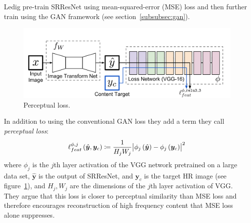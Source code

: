 Ledig \etal pre-train SRResNet using mean-squared-error (MSE) loss and then further train using the GAN framework (see section~\ref{subsubsec:gan}).
%
\begin{figure}
    \centering
    \begin{adjustbox}{width=\linewidth}
        \centering
        \includegraphics[]{figures/neural_networks/perceptual_loss.png}
    \end{adjustbox}
    \caption{Perceptual loss\cite{johnson2016perceptual}.}\label{fig:perceptualloss}
\end{figure}
In addition to using the conventional GAN loss they add a term they call \textit{perceptual loss}:
\begin{equation}
    \ell_{feat}^{\phi, j} \left( \hat{\bm{y}}, \bm{y}_c\right) \coloneqq \frac{1}{H_j W_j} \abs{\phi_j\left({\hat{\bm{y}}}\right) - \phi_j \left(\bm{y}_c\right)}^2
\end{equation}
where \(\phi_j\) is the \(j\)th layer activation of the VGG network\cite{simonyan2014very} pretrained on a large data set, \(\hat{\bm{y}}\) is the output of SRResNet, and \(\bm{y}_c\) is the target HR image (see figure~\ref{fig:perceptualloss}), and \(H_j, W_j\) are the dimensions of the \(j\)th layer activation of VGG.
%
They argue that this loss is closer to perceptual similarity than MSE loss and therefore encourages reconstruction of high frequency content that MSE loss alone suppresses.
